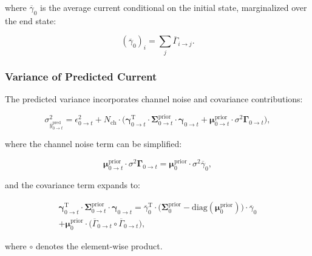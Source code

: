 \documentclass[pdflatex,sn-mathphys-num]{sn-jnl}%
\theoremstyle{thmstyleone}%
\theoremstyle{thmstyletwo}%
\theoremstyle{thmstylethree}%
\begin{document}
where \( \overline{\gamma}_0 \) is the average current conditional on the initial state, marginalized over the end state:

\begin{equation}
	(\overline{\gamma}_0)_i = \sum_j \overline{\Gamma}_{i \rightarrow j}.
	\label{eq:macro_gamma_marginal}
\end{equation}

\subsubsection{Variance of Predicted Current}

The predicted variance incorporates channel noise and covariance contributions:

\begin{equation}
	\sigma^2_{\overline{y}^{\text{pred}}_{0 \rightarrow t}} = \epsilon^2_{0 \rightarrow t} + N_{\text{ch}} \cdot \big( \mathbf{\gamma}_{0 \rightarrow t}^\mathrm{T} \cdot \mathbf{\Sigma}^{\text{prior}}_{0 \rightarrow t} \cdot \mathbf{\gamma}_{0 \rightarrow t} + \mathbf{\mu}^{\text{prior}}_{0 \rightarrow t} \cdot \sigma^2 \mathbf{\Gamma}_{0 \rightarrow t} \big),
	\label{eq:meta_macro_sigma_pred}
\end{equation}

where the channel noise term can be simplified:

\begin{equation}
	\mathbf{\mu}^{\text{prior}}_{0 \rightarrow t} \cdot \sigma^2 \mathbf{\Gamma}_{0 \rightarrow t} = \mathbf{\mu}^{\text{prior}}_0 \cdot \sigma^2 \overline{\gamma}_0,
	\label{eq:meta_channel_noise}
\end{equation}

and the covariance term expands to:

\begin{multline}
	\mathbf{\gamma}_{0 \rightarrow t}^\mathrm{T} \cdot \mathbf{\Sigma}^{\text{prior}}_{0 \rightarrow t} \cdot \mathbf{\gamma}_{0 \rightarrow t} =
	\overline{\gamma}_0^\mathrm{T} \cdot \big( \mathbf{\Sigma}^{\text{prior}}_0 - \mathrm{diag}(\mathbf{\mu}^{\text{prior}}_0) \big) \cdot \overline{\gamma}_0 \\
	+ \mathbf{\mu}^{\text{prior}}_0 \cdot \big( \overline{\Gamma}_{0 \rightarrow t} \circ \overline{\Gamma}_{0 \rightarrow t} \big),
	\label{eq:meta_state_cov_mult_expanded}
\end{multline}

where \( \circ \) denotes the element-wise product.
\end{document}
